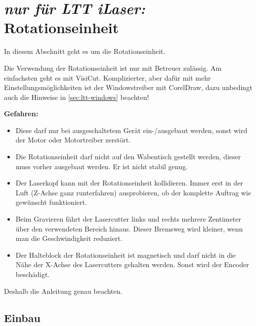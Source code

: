 \documentclass{\basedir/fablab-document}
\newcommand{\nurLTT}{\emph{nur für LTT iLaser:} }
\begin{document}
	\section{\nurLTT Rotationseinheit}
	In diesem Abschnitt geht es um die Rotationseinheit.

	 Die Verwendung der Rotationseinheit ist nur mit Betreuer zulässig.
	 Am einfachsten geht es mit VisiCut. Komplizierter, aber dafür mit mehr Einstellungsmöglichkeiten ist der Windowstreiber mit CorelDraw, dazu unbedingt auch die Hinweise in \cref{sec:ltt-windows} beachten!

	\textbf{Gefahren:}
	\begin{itemize}
		\item Diese darf nur bei ausgeschaltetem Gerät ein-/ausgebaut werden, sonst wird der Motor oder Motortreiber zerstört.
		\item Die Rotationseinheit darf nicht auf den Wabentisch gestellt werden, dieser muss vorher ausgebaut werden. Er ist nicht stabil genug.
		\item Der Laserkopf kann mit der Rotationseinheit kollidieren. Immer erst in der Luft (Z-Achse ganz runterfahren) ausprobieren, ob der komplette Auftrag wie gewünscht funktioniert.
		\item Beim Gravieren fährt der Lasercutter links und rechts mehrere Zentimeter über den verwendeten Bereich hinaus. Dieser Bremsweg wird kleiner, wenn man die Geschwindigkeit reduziert.
		\item Der Halteblock der Rotationseinheit ist magnetisch und darf nicht in die Nähe der X-Achse des Lasercutters gehalten werden. Sonst wird der Encoder beschädigt.
	\end{itemize}
	Deshalb die Anleitung genau beachten.

	\subsection{Einbau}
\end{document}
